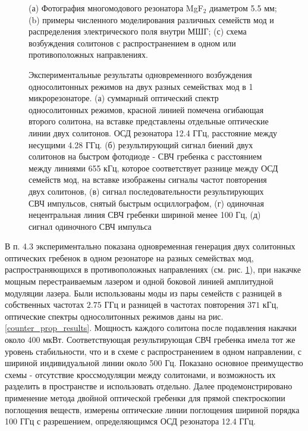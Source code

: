 \begin{figure}[!htb]
\begin{minipage}{1\linewidth}
\end{minipage}
\caption{(а) Фотография многомодового резонатора MgF$_2$ диаметром 5.5 мм; (b) примеры численного моделирования различных семейств мод и распределения электрического поля внутри МШГ; (с) схема возбуждения солитонов с распространением в одном или противоположных направлениях.}
\label{Figure1_V1_c}
\end{figure}

\begin{figure}[!htb]
\begin{minipage}{1\linewidth}
\end{minipage}
\caption{Экспериментальные результаты одновременного возбуждения односолитонных режимов на двух разных семействах мод в 1 микрорезонаторе. (а) суммарный оптический спектр односолитонных режимов, красной линией помечена огибающая второго солитона, на вставке представлены отдельные оптические линии двух солитонов. ОСД резонатора 12.4 ГГц, расстояние между несущими 4.28 ГГц. (б) результирующий сигнал биений двух солитонов на быстром фотодиоде - СВЧ гребенка с расстоянием между линиями 655 кГц, которое соответствует разнице между ОСД семейств мод, на вставке изображены сигналы частот повторения двух солитонов, (в) сигнал последовательности результирующих СВЧ импульсов, снятый быстрым осциллографом, (г) одиночная нецентральная линия СВЧ гребенки шириной менее 100 Гц, (д) сигнал одиночного СВЧ импульса}
\label{Co_Scheme_results}
\end{figure}

В п. 4.3 экспериментально показана одновременная генерация двух солитонных оптических гребенок в одном резонаторе на разных семействах мод, распространяющихся в противоположных направлениях (см. рис. \ref{Figure1_V1_c}), при накачке мощным перестраиваемым лазером и одной боковой линией амплитудной модуляции лазера. Были использованы моды из пары семейств с разницей в собственных частотах $2.75$ ГГц и разницей в частотах повторения $371$ кГц, оптические спектры односолитонных режимов даны на рис. \ref{counter_prop_results}. Мощность каждого солитона после подавления накачки около 400 мкВт. Соответствующая результирующая СВЧ гребенка имела тот же уровень стабильности, что и в схеме с распространением в одном направлении, с шириной индивидуальной линии около 500 Гц. Показано основное преимущество схемы - отсутствие кроссмодуляции между солитонами, и возможность их разделить в пространстве и использовать отдельно. Далее продемонстрировано применение метода двойной оптической гребенки для прямой спектроскопии поглощения веществ, измерены оптические линии поглощения шириной порядка 100 ГГц с разрешением, определяющимся ОСД резонатора 12.4 ГГц.

